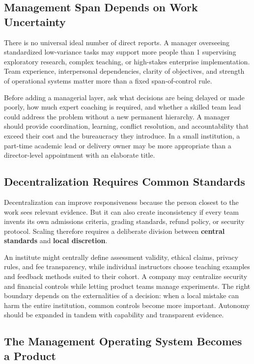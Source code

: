 \subsection{Management Span Depends on Work Uncertainty}
\label{sec:management_span_uncertainty}

There is no universal ideal number of direct reports. A manager overseeing standardized low-variance tasks may support more people than 1 supervising exploratory research, complex teaching, or high-stakes enterprise implementation. Team experience, interpersonal dependencies, clarity of objectives, and strength of operational systems matter more than a fixed span-of-control rule.

Before adding a managerial layer, ask what decisions are being delayed or made poorly, how much expert coaching is required, and whether a skilled team lead could address the problem without a new permanent hierarchy. A manager should provide coordination, learning, conflict resolution, and accountability that exceed their cost and the bureaucracy they introduce. In a small institution, a part-time academic lead or delivery owner may be more appropriate than a director-level appointment with an elaborate title.

\subsection{Decentralization Requires Common Standards}
\label{sec:decentralization_common_standards}

Decentralization can improve responsiveness because the person closest to the work sees relevant evidence. But it can also create inconsistency if every team invents its own admissions criteria, grading standards, refund policy, or security protocol. Scaling therefore requires a deliberate division between \textbf{central standards} and \textbf{local discretion}.

An institute might centrally define assessment validity, ethical claims, privacy rules, and fee transparency, while individual instructors choose teaching examples and feedback methods suited to their cohort. A company may centralize security and financial controls while letting product teams manage experiments. The right boundary depends on the externalities of a decision: when a local mistake can harm the entire institution, common controls become more important. Autonomy should be expanded in tandem with capability and transparent evidence.

\subsection{The Management Operating System Becomes a Product}
\label{sec:management_operating_system_product}

